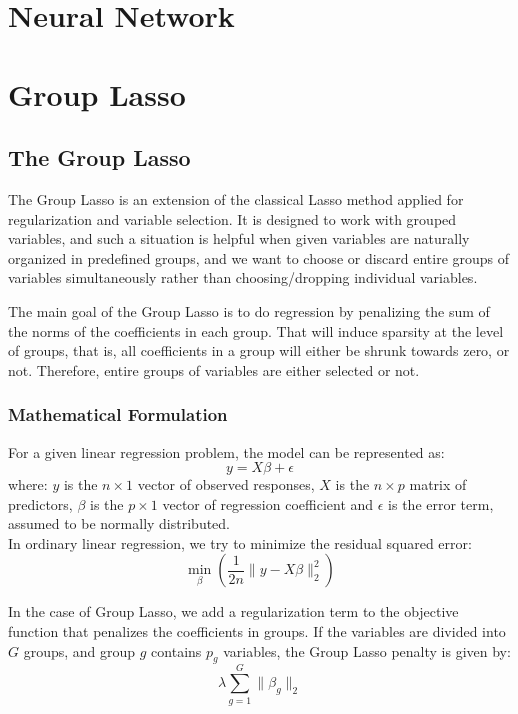 \documentclass[a4paper, 8pt]{article}
\begin{document}
\begin{multicols}{2}
\section{Neural Network}

\section{Group Lasso}
\subsection{The Group Lasso}
The Group Lasso is an extension of the classical Lasso method applied for regularization and variable selection. It is designed to work with grouped variables, and such a situation is helpful when given variables are naturally organized in predefined groups, and we want to choose or discard entire groups of variables simultaneously rather than choosing/dropping individual variables.

The main goal of the Group Lasso is to do regression by penalizing the sum of the norms of the coefficients in each group. That will induce sparsity at the level of groups, that is, all coefficients in a group will either be shrunk towards zero, or not. Therefore, entire groups of variables are either selected or not.

\subsubsection{Mathematical Formulation}
For a given linear regression problem, the model can be represented as:
\begin{equation}
y=X\beta + \epsilon
\end{equation}
where: $y$ is the $n \times 1$ vector of observed responses, $X$ is the $n \times p$ matrix of predictors, $\beta$ is the $p \times 1$ vector of regression coefficient and $\epsilon$ is the error term, assumed to be normally distributed.\\

In ordinary linear regression, we try to minimize the residual squared error:
\begin{equation}
\min_{\beta}\left (\frac{1}{2n}\lVert y-X\beta\rVert^{2}_{2} \right)
\end{equation}

In the case of Group Lasso, we add a regularization term to the objective function that penalizes the coefficients in groups. If the variables are divided into $G$ groups, and group $g$ contains $p_{g}$ variables, the Group Lasso penalty is given by:
\begin{equation}
\lambda \sum_{g=1}^{G}\lVert \beta_{g} \rVert_{2}
\end{equation}


\end{multicols}
\end{document}
